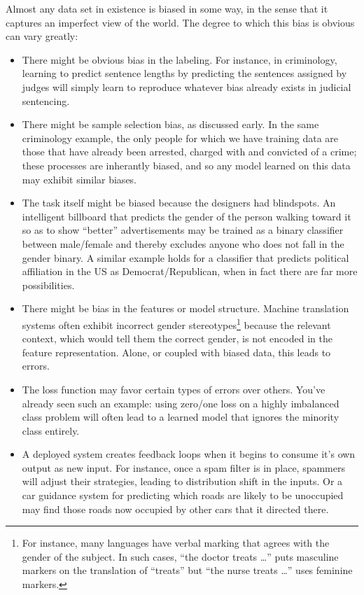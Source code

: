 Almost any data set in existence is biased in some way, in the sense that it captures an imperfect view of the world.
The degree to which this bias is obvious can vary greatly:
\begin{itemize}
\item There might be obvious bias in the labeling. For instance, in criminology, learning to predict sentence lengths by predicting the sentences assigned by judges will simply learn to reproduce whatever bias already exists in judicial sentencing.
\item There might be sample selection bias, as discussed early. In the same criminology example, the only people for which we have training data are those that have already been arrested, charged with and convicted of a crime; these processes are inherantly biased, and so any model learned on this data may exhibit similar biases.
\item The task itself might be biased because the designers had blindspots. An intelligent billboard that predicts the gender of the person walking toward it so as to show ``better'' advertisements may be trained as a binary classifier between male/female and thereby excludes anyone who does not fall in the gender binary. A similar example holds for a classifier that predicts political affiliation in the US as Democrat/Republican, when in fact there are far more possibilities.
\item There might be bias in the features or model structure. Machine translation systems often exhibit incorrect gender stereotypes\footnote{For instance, many languages have verbal marking that agrees with the gender of the subject. In such cases, ``the doctor treats \dots'' puts masculine markers on the translation of ``treats'' but ``the nurse treats \dots'' uses feminine markers.} because the relevant context, which would tell them the correct gender, is not encoded in the feature representation. Alone, or coupled with biased data, this leads to errors.
\item The loss function may favor certain types of errors over others. You've already seen such an example: using zero/one loss on a highly imbalanced class problem will often lead to a learned model that ignores the minority class entirely.
\item A deployed system creates feedback loops when it begins to consume it's own output as new input. For instance, once a spam filter is in place, spammers will adjust their strategies, leading to distribution shift in the inputs. Or a car guidance system for predicting which roads are likely to be unoccupied may find those roads now occupied by other cars that it directed there.
\end{itemize}
